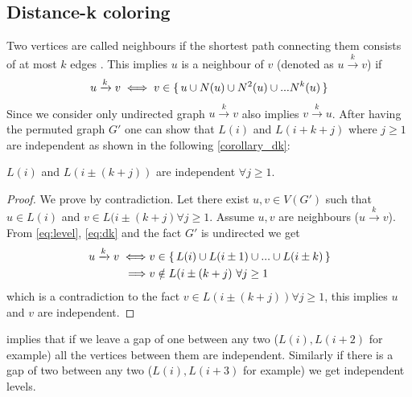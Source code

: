  \subsection{Distance-k coloring} \label{subsec:DK}
 Two vertices are called \DK neighbours if the shortest path connecting them consists of at most $k$ edges \cite{dist_k_def}. This implies $u$ is a \DK neighbour of $v$ (denoted as $u\xrightarrow{k}v$)  if
 \begin{equation}\label{eq:dk}
	  u\xrightarrow{k}v  \iff  v \in \set{ u \cup N(u) \cup N^2(u) \cup ... N^k(u) }	 
 \end{equation}
 Since we consider only undirected graph $u\xrightarrow{k}v$ also implies $v\xrightarrow{k}u$. 
  After having the permuted graph $G'$ one can show that $L(i)$ and $L(i+k+j)$ where $j\geq1$ are \DK independent as shown in the following \cref{corollary_dk}:
  \begin{corollary}\label{corollary_dk}
   $L(i)$ and $L(i\pm(k+j))$ are \DK independent $\forall j\geq1$. 
  \end{corollary}
  \begin{proof}
  	We prove by contradiction. Let there exist $u,v \in V(G')$ such that  $u \in L(i)$ and $v \in  L(i \pm (k+j) \forall j\geq1$. Assume $u,v$ are \DK neighbours ($u\xrightarrow{k}v$). From \cref{eq:level}, \cref{eq:dk} and the fact $G'$ is undirected we get 
  	\begin{align*}
	  	u\xrightarrow{k}v \iff & v \in \set{L(i) \cup L(i \pm 1) \cup ... \cup L(i \pm k)} \\
	  	\implies & v \notin L(i \pm (k+j) \text{  } \forall j \geq 1
  	\end{align*}
  	which is a contradiction to the fact $v \in L(i \pm (k+j) ) \forall j \geq 1$, this implies $u$ and $v$ are \DK independent.
  \end{proof}

 implies that if we leave a gap of \emph{\atleast} one \level between any two \levels ($L(i), L(i+2)$ for example) all the vertices between them are \DONE independent. Similarly if there is a gap of \emph{\atleast} two \levels between any two \levels ($L(i), L(i+3)$ for example) we get \DTWO independent levels.
  
